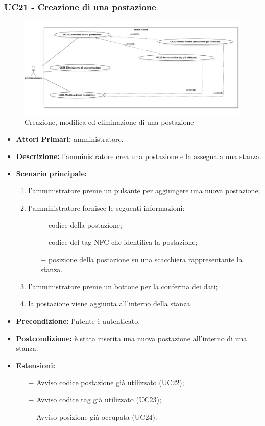\subsubsection{UC21 - Creazione di una postazione}
\begin{figure}[H]
	\centering
	\includegraphics[width=18cm]{res/images/UC21-22-23-25-26.png}
	\caption{Creazione, modifica ed eliminazione di una postazione}
\end{figure}
\begin{itemize}
	\item\textbf{Attori Primari:}
	amministratore.
	\item\textbf{Descrizione:}
	l'amministratore crea una postazione e la assegna a una stanza.
	\item\textbf{Scenario principale:} 
	\begin{enumerate}
		\item l'amministratore preme un pulsante per aggiungere una nuova postazione;
		\item l'amministratore fornisce le seguenti informazioni:
		\begin{itemize}
			\item[$-$] codice della postazione;
			\item[$-$] codice del tag NFC che identifica la postazione;
			\item[$-$] posizione della postazione su una scacchiera rappresentante la stanza.
		\end{itemize}
		\item l'amministratore preme un bottone per la conferma dei dati;
		\item la postazione viene aggiunta all'interno della stanza.
	\end{enumerate}
	\item\textbf{Precondizione:} 
	l'utente è autenticato.
	\item\textbf{Postcondizione:}
	è stata inserita una nuova postazione all'interno di una stanza.
	\item\textbf{Estensioni:}
	\begin{itemize}
		\item[$-$] Avviso codice postazione già utilizzato (UC22);
		\item[$-$] Avviso codice tag già utilizzato (UC23);
		\item[$-$] Avviso posizione già occupata (UC24).
	\end{itemize}
\end{itemize}


